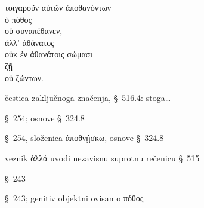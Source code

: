 {\large
\begin{greek}
\noindent τοιγαροῦν αὐτῶν ἀποθανόντων \\
ὁ πόθος \\
οὐ συναπέθανεν, \\
ἀλλ' ἀθάνατος \\
\tabto{2em} οὐκ ἐν ἀθανάτοις σώμασι \\
ζῇ \\
\tabto{2em} οὐ ζώντων. \\

\end{greek}
}

\begin{description}[noitemsep]
\item[τοιγαροῦν] čestica zaključnoga značenja, §~516.4: stoga\dots
\item[ἀποθανόντων] §~254; osnove §~324.8
\item[οὐ συναπέθανεν] §~254, složenica ἀποθνῄσκω, osnove §~324.8
\item[ἀλλ'] veznik ἀλλά uvodi nezavisnu suprotnu rečenicu §~515
\item[ζῇ] §~243
\item[ζώντων] §~243; genitiv objektni ovisan o πόθος

\end{description}

